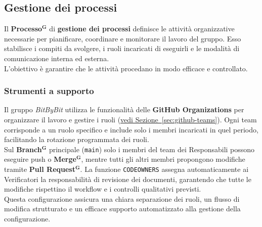 \documentclass[a4paper,12pt]{article}
\newcommand{\term}[1]{\textbf{#1}$^\mathbf{G}$}
\begin{document}
\subsection{Gestione dei processi} \label{sec:gestione-processi}
Il \term{Processo} di \textbf{gestione dei processi} definisce le attività organizzative necessarie per pianificare, coordinare e monitorare il lavoro del gruppo. Esso stabilisce i compiti da svolgere, i ruoli incaricati di eseguirli e le modalità di comunicazione interna ed esterna.\\
L’obiettivo è garantire che le attività procedano in modo efficace e controllato.

\subsubsection{Strumenti a supporto}
Il gruppo \textit{BitByBit} utilizza le funzionalità delle \textbf{GitHub Organizations} per organizzare il lavoro e gestire i ruoli (\hyperref[sec:github-teams]{vedi Sezione~\ref*{sec:github-teams}}). Ogni team corrisponde a un ruolo specifico e include solo i membri incaricati in quel periodo, facilitando la rotazione programmata dei ruoli.\\
Sul \term{Branch} principale (\texttt{main}) solo i membri del team dei Responsabili possono eseguire push o \term{Merge}, mentre tutti gli altri membri propongono modifiche tramite \term{Pull Request}. La funzione \texttt{CODEOWNERS} assegna automaticamente ai Verificatori la responsabilità di revisione dei documenti, garantendo che tutte le modifiche rispettino il workflow e i controlli qualitativi previsti.\\
Questa configurazione assicura una chiara separazione dei ruoli, un flusso di modifica strutturato e un efficace supporto automatizzato alla gestione della configurazione.
\end{document}
